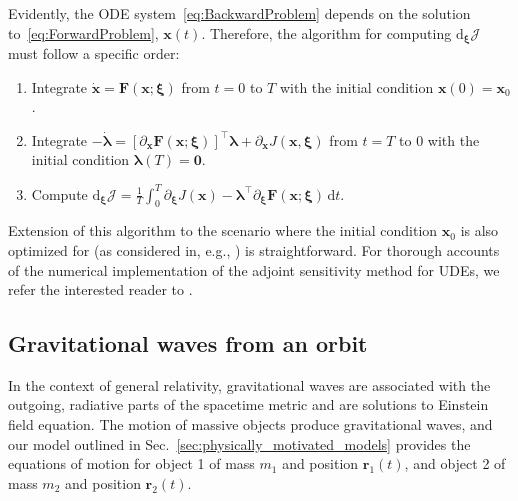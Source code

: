\documentclass[ reprint,
nofootinbib,
 amsmath,amssymb,
 aps,
]{revtex4-2}
\begin{document}
Evidently, the ODE system~\cref{eq:BackwardProblem} depends on the solution to~\cref{eq:ForwardProblem}, $\mathbf{x}(t)$.
Therefore, the algorithm for computing $\mathrm{d}_{\bm{\xi}} \mathcal{J}$ must follow a specific order:
\begin{enumerate}
	\item
	Integrate $\dot{\mathbf{x}} = \mathbf{F}(\mathbf{x};{\bm{\xi}})$ from $t = 0$ to $T$ with the initial condition $\mathbf{x}(0) = \mathbf{x}_0$.
	\item
	Integrate $-\dot{\bm{\lambda}} = [\partial_\mathbf{x}\mathbf{F}(\mathbf{x};{\bm{\xi}})]^\top\bm{\lambda} + \partial_\mathbf{x} J(\mathbf{x},{\bm{\xi}})$ from $t = T$ to $0$ with the initial condition $\bm{\lambda}(T) = \bm{0}$.
	\item
	Compute $\mathrm{d}_{\bm{\xi}} \mathcal{J} = \frac{1}{T}\int_{0}^{T}\partial_{\bm{\xi}} J(\mathbf{x})-\bm{\lambda}^\top \partial_{\bm{\xi}} \mathbf{F}(\mathbf{x};{\bm{\xi}})\,\mathrm{d}t$.
\end{enumerate}
Extension of this algorithm to the scenario where the initial condition $\mathbf{x}_0$ is also optimized for (as considered in, e.g., ) is straightforward.
For thorough accounts of the numerical implementation of the adjoint sensitivity method for UDEs, we refer the interested reader to \cite{rackauckas2020universal,Gholami2020ANODE}.




\subsection{Gravitational waves from an orbit}\label{sub:gravitational_waves_from_an_orbit}


In the context of general relativity,
gravitational waves are associated with the outgoing, radiative parts of the 
spacetime metric and are solutions to Einstein field 
equation. The motion of massive objects produce gravitational waves, and 
our model outlined in Sec.~\ref{sec:physically_motivated_models} provides the equations of motion for
object 1 of mass $m_1$ and position $\mathbf{r}_1(t)$, and 
object 2 of mass $m_2$ and position $\mathbf{r}_2(t)$.
\end{document}
